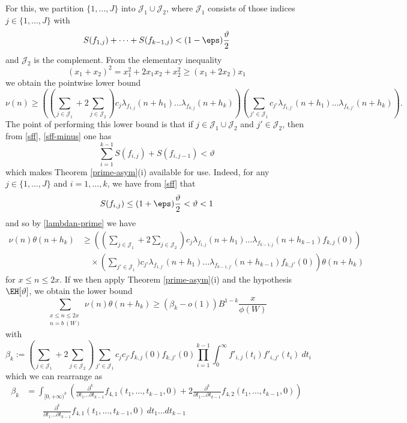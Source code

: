 For this, we partition $\{1,\dots,J\}$ into ${\mathcal J}_1 \cup {\mathcal J}_2$, where ${\mathcal J}_1$ consists of those indices $j \in \{1,\dots,J\}$ with
\begin{equation}\label{sff-minus}
S(f_{1,j}) + \dots + S(f_{k-1,j}) < (1-\eps) \frac{\vartheta}{2}
\end{equation}
and ${\mathcal J}_2$ is the complement.  From the elementary inequality
$$ (x_1 + x_2)^2 = x_1^2 + 2x_1 x_2 + x_2^2 \geq (x_1+2x_2) x_1 $$
we obtain the pointwise lower bound
$$ \nu(n) \geq 
\left( (\sum_{j \in {\mathcal J}_1} + 2 \sum_{j \in {\mathcal J}_2}) c_j \lambda_{f_{1,j}}(n+h_1) \dots \lambda_{f_{k,j}}(n+h_k) \right)
\left( \sum_{j' \in {\mathcal J}_1} c_{j'} \lambda_{f_{1,j'}}(n+h_1) \dots \lambda_{f_{k,j'}}(n+h_k) \right).$$
The point of performing this lower bound is that if $j \in {\mathcal J}_1 \cup {\mathcal J}_2$ and $j' \in {\mathcal J}_2$, then from \eqref{sff}, \eqref{sff-minus} one has
$$ \sum_{i=1}^{k-1} S(f_{i,j}) + S(f_{i,j-1}) < \vartheta$$
which makes Theorem \ref{prime-asym}(i) available for use.  Indeed, for any $j \in \{1,\dots,J\}$ and $i=1,\dots,k$, we have from \eqref{sff} that
$$ S(f_{i,j}) \leq (1+\eps) \frac{\vartheta}{2} < \vartheta < 1$$
and so by \eqref{lambdan-prime} we have
\begin{equation}\label{nutheta}
\begin{split}
 \nu(n) \theta(n+h_k) &\geq 
\left( (\sum_{j \in {\mathcal J}_1} + 2 \sum_{j \in {\mathcal J}_2}) c_j \lambda_{f_{1,j}}(n+h_1) \dots \lambda_{f_{k-1,j}}(n+h_{k-1}) f_{k,j}(0) \right)\\
&\quad \times \left( \sum_{j' \in {\mathcal J}_1}) c_{j'} \lambda_{f_{1,j'}}(n+h_1) \dots \lambda_{f_{k-1,j'}}(n+h_{k-1}) f_{k,j'}(0) \right) \theta(n+h_k)
\end{split}
\end{equation}
for $x \leq n \leq 2x$.  If we then apply Theorem \ref{prime-asym}(i) and the hypothesis $\EH[\vartheta]$, we obtain the lower bound
$$ 
 \sum_{\substack{x \leq n \leq 2x\\ n = b\ (W)}} \nu(n) \theta(n+h_k) \geq (\beta_k - o(1)) B^{1-k} \frac{x}{\phi(W)}$$
with
$$ \beta_k :=
(\sum_{j \in {\mathcal J}_1} + 2 \sum_{j \in {\mathcal J}_2}) \sum_{j' \in {\mathcal J}_1} c_j c_{j'} f_{k,j}(0) f_{k,j'}(0)
\prod_{i=1}^{k-1} \int_0^\infty f'_{i,j}(t_i) f'_{i,j'}(t_i)\ dt_i $$
which we can rearrange as
\begin{align*}
\beta_k &= \int_{[0,+\infty)^k} \left(\frac{\partial^k}{\partial t_1 \dots \partial t_{k-1}} f_{4,1}(t_1,\dots,t_{k-1},0) + 2\frac{\partial^k}{\partial t_1 \dots \partial t_{k-1}} f_{4,2}(t_1,\dots,t_{k-1},0)\right)\\
&\quad\quad  \frac{\partial^k}{\partial t_1 \dots \partial t_{k-1}} f_{4,1}(t_1,\dots,t_{k-1},0)\ dt_1 \dots dt_{k-1} 
\end{align*}

